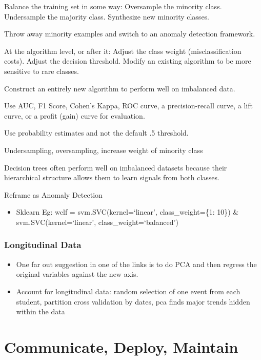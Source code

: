 \documentclass[]{book}
\providecommand{\tightlist}{%
  \setlength{\itemsep}{0pt}\setlength{\parskip}{0pt}}
\theoremstyle{definition}
\theoremstyle{definition}
\theoremstyle{definition}
\theoremstyle{remark}
\begin{document}
Balance the training set in some way: Oversample the minority class.
Undersample the majority class. Synthesize new minority classes.

Throw away minority examples and switch to an anomaly detection
framework.

At the algorithm level, or after it: Adjust the class weight
(misclassification costs). Adjust the decision threshold. Modify an
existing algorithm to be more sensitive to rare classes.

Construct an entirely new algorithm to perform well on imbalanced data.

Use AUC, F1 Score, Cohen's Kappa, ROC curve, a precision-recall curve, a
lift curve, or a profit (gain) curve for evaluation.

Use probability estimates and not the default .5 threshold.

Undersampling, oversampling, increase weight of minority class

Decision trees often perform well on imbalanced datasets because their
hierarchical structure allows them to learn signals from both classes.

Reframe as Anomaly Detection

\begin{itemize}
\tightlist
\item
  Sklearn Eg: wclf = svm.SVC(kernel=`linear', class\_weight=\{1: 10\})
  \& svm.SVC(kernel=`linear', class\_weight=`balanced')
\end{itemize}

\subsection{Longitudinal Data}\label{longitudinal-data}

\begin{itemize}
\item
  One far out suggestion in one of the links is to do PCA and then
  regress the original variables against the new axis.
\item
  Account for longitudinal data: random selection of one event from each
  student, partition cross validation by dates, pca finds major trends
  hidden within the data
\end{itemize}

\chapter{Communicate, Deploy,
Maintain}\label{communicate-deploy-maintain}
\end{document}
